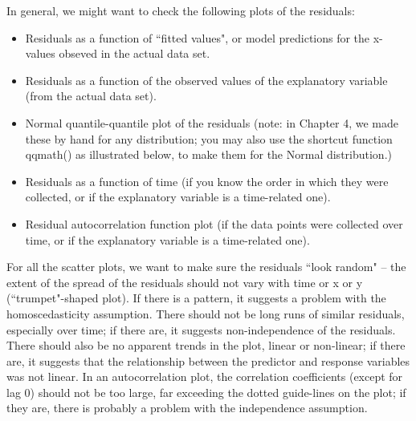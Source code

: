 \documentclass[twoside]{book}\usepackage[]{graphicx}\usepackage[]{xcolor}
\begin{document}
In general, we might want to check the following plots of the residuals:
\begin{itemize}
\item Residuals as a function of ``fitted values", or model predictions for the x-values obseved in the actual data set.
\item Residuals as a function of the observed values of the explanatory variable (from the actual data set).
\item Normal quantile-quantile plot of the residuals (note: in Chapter 4, we made these by hand for any distribution; you may also use the shortcut function qqmath() as illustrated below, to make them for the Normal distribution.)
\item Residuals as a function of time (if you know the order in which they were collected, or if the explanatory variable is a time-related one).
\item Residual autocorrelation function plot (if the data points were collected over time, or if the explanatory variable is a time-related one).
\end{itemize}

For all the scatter plots, we want to make sure the residuals ``look random" -- the extent of the spread of the residuals should not vary with time or x or y (``trumpet"-shaped plot).  If there is a pattern, it suggests a problem with the homoscedasticity assumption.  There should not be long runs of similar residuals, especially over time; if there are, it suggests non-independence of the residuals.  There should also be no apparent trends in the plot, linear or non-linear; if there are, it suggests that the relationship between the predictor and response variables was not linear.  In an autocorrelation plot, the correlation coefficients (except for lag 0) should not be too large, far exceeding the dotted guide-lines on the plot; if they are, there is probably a problem with the independence assumption.
\end{document}
